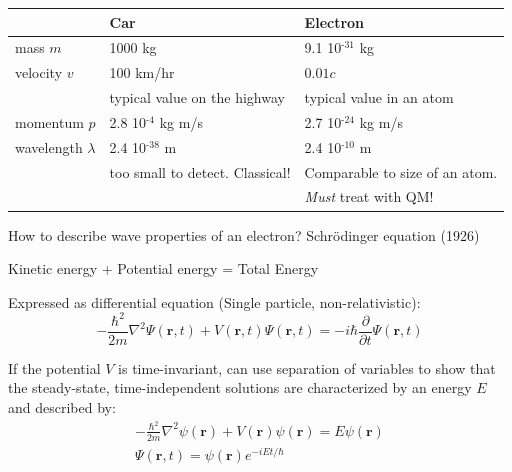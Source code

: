 \documentclass[11pt]{article}
\begin{document}
\begin{center}
\begin{tabular}{lll}
\hline
 & Car & Electron\\
\hline
mass $m$ & 1000 kg & 9.1\texttimes{} 10$^{\text{-31}}$ kg\\
velocity $v$ & 100 km/hr & $0.01 c$\\
 & typical value on the highway & typical value in an atom\\
momentum $p$ & 2.8\texttimes{} 10$^{\text{-4}}$ kg m/s & 2.7 \texttimes{} 10$^{\text{-24}}$ kg m/s\\
wavelength $\lambda$ & 2.4 \texttimes{} 10$^{\text{-38}}$ m & 2.4 \texttimes{} 10$^{\text{-10}}$ m\\
 & too small to detect.  Classical! & Comparable to size of an atom.\\
 &  & \emph{Must} treat with QM!\\
\hline
\end{tabular}
\end{center}

How to describe wave properties of an electron?  Schr\"{o}dinger equation (1926)

\begin{center}
Kinetic energy + Potential energy = Total Energy
\end{center}

Expressed as differential equation (Single particle, non-relativistic):
\begin{equation}
-\frac{\hbar^2}{2m}\nabla^2 \Psi(\mathbf{r},t) + V(\mathbf{r},t)  \Psi(\mathbf{r},t) = -i \hbar \frac{\partial}{\partial t}  \Psi(\mathbf{r},t)
\end{equation}

If the potential \(V\) is time-invariant, can use separation of variables to
show that the steady-state, time-independent solutions are characterized by an
energy \(E\) and described by:
\begin{eqnarray}
-\frac{\hbar^2}{2m}\nabla^2 \psi(\mathbf{r}) + V(\mathbf{r})  \psi(\mathbf{r}) = E \psi(\mathbf{r}) \\
\Psi(\mathbf{r},t) = \psi(\mathbf{r})e^{-iEt/\hbar}
\end{eqnarray}
\end{document}
